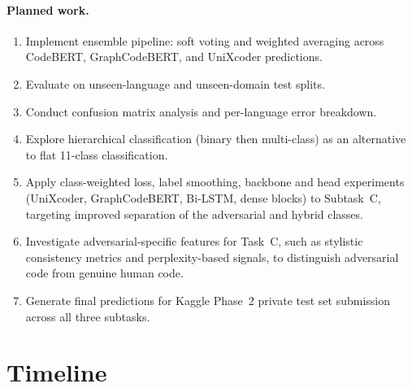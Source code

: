 \documentclass[11pt]{article}
\begin{document}
\paragraph{Planned work.}
\begin{enumerate}
    \item Implement ensemble pipeline: soft voting and weighted averaging across CodeBERT, GraphCodeBERT, and UniXcoder predictions.
    \item Evaluate on unseen-language and unseen-domain test splits.
    \item Conduct confusion matrix analysis and per-language error breakdown.
    \item Explore hierarchical classification (binary then multi-class) as an alternative to flat 11-class classification.
    \item Apply class-weighted loss, label smoothing, backbone and head experiments (UniXcoder, GraphCodeBERT, Bi-LSTM, dense blocks) to Subtask~C, targeting improved separation of the adversarial and hybrid classes.
    \item Investigate adversarial-specific features for Task~C, such as stylistic consistency metrics and perplexity-based signals, to distinguish adversarial code from genuine human code.
    \item Generate final predictions for Kaggle Phase~2 private test set submission across all three subtasks.
\end{enumerate}

\section{Timeline}
\label{sec:timeline}
\end{document}
